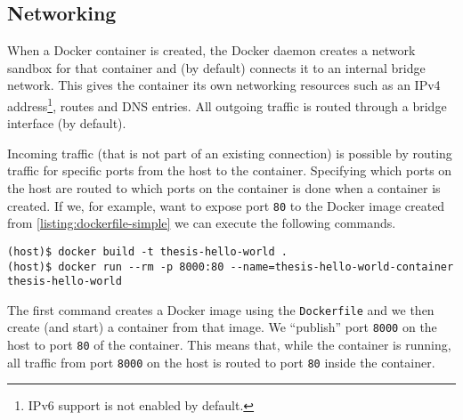 \subsection{Networking}
When a Docker container is created, the Docker daemon creates a network sandbox for that container and (by default) connects it to an internal bridge network. This gives the container its own networking resources such as an IPv4 address\footnote{IPv6 support is not enabled by default.}, routes and DNS entries. All outgoing traffic is routed through a bridge interface (by default).

\medskip

Incoming traffic (that is not part of an existing connection) is possible by routing traffic for specific ports from the host to the container.
Specifying which ports on the host are routed to which ports on the container is done when a container is created. If we, for example, want to expose port \lstinline{80} to the Docker image created from \autoref{listing:dockerfile-simple} we can execute the following commands.

\begin{lstlisting}[caption={Creating a Docker container with exposed port.},label={listing:docker-port},captionpos=b]
(host)$ docker build -t thesis-hello-world .
(host)$ docker run --rm -p 8000:80 --name=thesis-hello-world-container thesis-hello-world
\end{lstlisting}

The first command creates a Docker image using the \lstinline{Dockerfile} and we then create (and start) a container from that image. We ``publish'' port \lstinline{8000} on the host to port \lstinline{80} of the container. This means that, while the container is running, all traffic from port \lstinline{8000} on the host is routed to port \lstinline{80} inside the container.
